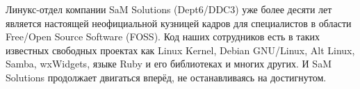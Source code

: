 \documentclass[10pt, a5paper]{article}
\begin{document}
Линукс-отдел компании SaM Solutions (Dept6/DDC3) уже более десяти лет является настоящей неофициальной кузницей кадров для специалистов в области Free/Open Source Software (FOSS). Код наших сотрудников есть в таких известных свободных проектах как Linux Kernel, Debian GNU/Linux, Alt Linux, Samba, wxWidgets, языке Ruby и его библиотеках и многих других. И SaM Solutions продолжает двигаться вперёд, не останавливаясь на достигнутом.
\begin{figure}[ht]
\end{figure}
\end{document}
